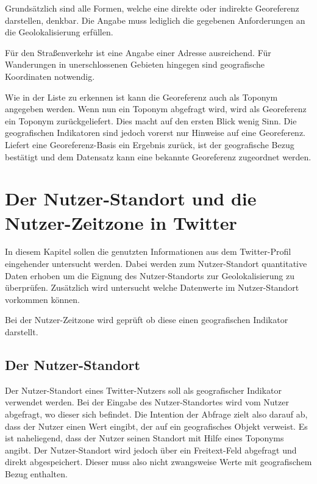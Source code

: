	 	Grundsätzlich sind alle Formen, welche eine direkte oder indirekte Georeferenz darstellen, denkbar.
	 	Die Angabe muss lediglich die gegebenen Anforderungen an die Geolokalisierung erfüllen.

	  	Für den Straßenverkehr ist eine Angabe einer Adresse ausreichend.
		Für Wanderungen in unerschlossenen Gebieten hingegen sind geografische Koordinaten notwendig. 

		Wie in der Liste zu erkennen ist kann die Georeferenz auch als Toponym angegeben werden.
		Wenn nun ein Toponym abgefragt wird, wird als Georeferenz ein Toponym zurückgeliefert.
		Dies macht auf den ersten Blick wenig Sinn.
		Die geografischen Indikatoren sind jedoch vorerst nur Hinweise auf eine Georeferenz.
		Liefert eine Georeferenz-Basis ein Ergebnis zurück, ist der geografische Bezug bestätigt und dem Datensatz kann eine bekannte Georeferenz zugeordnet werden.				
	
	\section{Der Nutzer-Standort und die Nutzer-Zeitzone in Twitter}

		In diesem Kapitel sollen die genutzten Informationen aus dem Twitter-Profil eingehender untersucht werden.
		Dabei werden zum Nutzer-Standort quantitative Daten erhoben um die Eignung des Nutzer-Standorts zur Geolokalisierung zu überprüfen.
		Zusätzlich wird untersucht welche Datenwerte im Nutzer-Standort vorkommen können.

		Bei der Nutzer-Zeitzone wird geprüft ob diese einen geografischen Indikator darstellt. 

		\subsection{Der Nutzer-Standort} \label{sec:nutzerStandort} 

			Der Nutzer-Standort eines Twitter-Nutzers soll als geografischer Indikator verwendet werden.
			Bei der Eingabe des Nutzer-Standortes wird vom Nutzer abgefragt, wo dieser sich befindet. 
			Die Intention der Abfrage zielt also darauf ab, dass der Nutzer einen Wert eingibt, der auf ein geografisches Objekt verweist. 
			Es ist naheliegend, dass der Nutzer seinen Standort mit Hilfe eines Toponyms angibt.
			Der Nutzer-Standort wird jedoch über ein Freitext-Feld abgefragt und direkt abgespeichert.
			Dieser muss also nicht zwangsweise Werte mit geografischem Bezug enthalten. 

